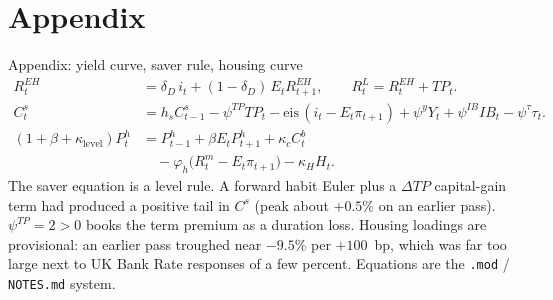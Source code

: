 \documentclass[11pt,aspectratio=169]{beamer}
\begin{document}
\section{Appendix}
\begin{frame}{Appendix: yield curve, saver rule, housing curve}
  {\footnotesize
  \begin{align*}
    R^{EH}_{t}
      &= \delta_{D}\, i_{t} + (1-\delta_{D})\, E_{t} R^{EH}_{t+1},
      \qquad
      R^{L}_{t} = R^{EH}_{t}+TP_{t}. \\[0.35em]
    C^{s}_{t}
      &= h_{s} C^{s}_{t-1}
       - \psi^{TP} TP_{t}
       - \mathrm{eis}\,(i_{t}-E_{t}\pi_{t+1})
       + \psi^{y} Y_{t}
       + \psi^{IB} IB_{t}
       - \psi^{\tau}\tau_{t}. \\[0.35em]
    (1+\beta+\kappa_{\mathrm{level}}) P^{h}_{t}
      &= P^{h}_{t-1}
       + \beta E_{t} P^{h}_{t+1}
       + \kappa_{c} C^{b}_{t} \\
      &\quad
       - \varphi_{h}\bigl(R^{m}_{t}-E_{t}\pi_{t+1}\bigr)
       - \kappa_{H} H_{t}.
  \end{align*}
  }
  \vspace{0.15em}
  {\scriptsize
  The saver equation is a level rule.
  A forward habit Euler plus a $\Delta TP$ capital-gain term had produced
  a positive tail in $C^{s}$ (peak about $+0.5\%$ on an earlier pass).
  $\psi^{TP}=2>0$ books the term premium as a duration loss.
  Housing loadings are provisional: an earlier pass troughed near
  $-9.5\%$ per $+100$~bp, which was far too large next to UK
  Bank Rate responses of a few percent.
  Equations are the \texttt{.mod} / \texttt{NOTES.md} system.}
\end{frame}
\end{document}
